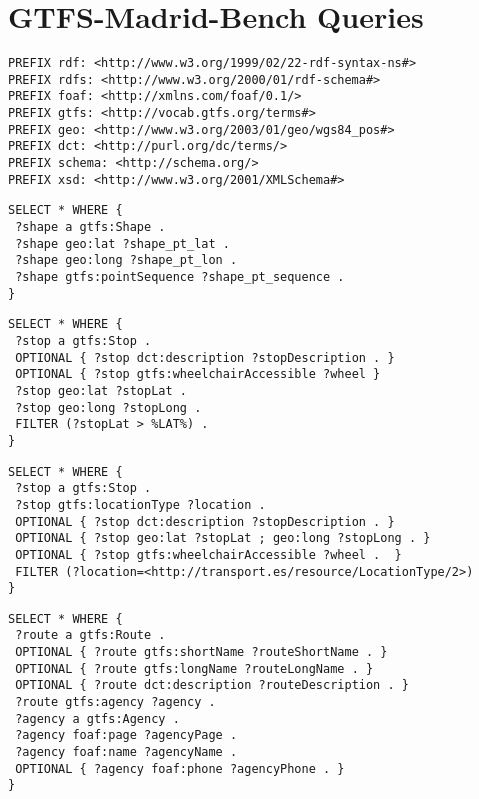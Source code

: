 \chapter{GTFS-Madrid-Bench Queries}
\label{sec:appendix1}

\begin{lstlisting}[caption=Prefixes, label=lst:prefixes, basicstyle=\small,frame=single]
PREFIX rdf: <http://www.w3.org/1999/02/22-rdf-syntax-ns#>
PREFIX rdfs: <http://www.w3.org/2000/01/rdf-schema#>
PREFIX foaf: <http://xmlns.com/foaf/0.1/>
PREFIX gtfs: <http://vocab.gtfs.org/terms#>
PREFIX geo: <http://www.w3.org/2003/01/geo/wgs84_pos#>
PREFIX dct: <http://purl.org/dc/terms/>
PREFIX schema: <http://schema.org/>
PREFIX xsd: <http://www.w3.org/2001/XMLSchema#>
\end{lstlisting}

\begin{lstlisting}[caption=Query 1 - List all shapes with some of their data, label=lst:sparql1, basicstyle=\small,frame=single]
SELECT * WHERE {
 ?shape a gtfs:Shape .
 ?shape geo:lat ?shape_pt_lat .
 ?shape geo:long ?shape_pt_lon .
 ?shape gtfs:pointSequence ?shape_pt_sequence .
}
\end{lstlisting}

\begin{lstlisting}[caption={Query 2 - List all stops with some of their data including geographic coordinates, where the latitude is bigger than its mean}, label=lst:sparql2, basicstyle=\small,frame=single]
SELECT * WHERE {
 ?stop a gtfs:Stop . 
 OPTIONAL { ?stop dct:description ?stopDescription . }
 OPTIONAL { ?stop gtfs:wheelchairAccessible ?wheel }
 ?stop geo:lat ?stopLat . 
 ?stop geo:long ?stopLong .
 FILTER (?stopLat > %LAT%) .		
}
\end{lstlisting}

\begin{lstlisting}[caption={Query 3 - Find the accessibility information for the stations, if available}, label=lst:sparql3, basicstyle=\small,frame=single]
SELECT * WHERE {
 ?stop a gtfs:Stop . 
 ?stop gtfs:locationType ?location .
 OPTIONAL { ?stop dct:description ?stopDescription . }
 OPTIONAL { ?stop geo:lat ?stopLat ; geo:long ?stopLong . }
 OPTIONAL { ?stop gtfs:wheelchairAccessible ?wheel .  }
 FILTER (?location=<http://transport.es/resource/LocationType/2>)
}
\end{lstlisting}

\begin{lstlisting}[caption=Query 4 - List all agencies and their routes with some of their data, label=lst:sparql4, basicstyle=\small,frame=single]
SELECT * WHERE {
 ?route a gtfs:Route .
 OPTIONAL { ?route gtfs:shortName ?routeShortName . }
 OPTIONAL { ?route gtfs:longName ?routeLongName . } 
 OPTIONAL { ?route dct:description ?routeDescription . } 
 ?route gtfs:agency ?agency .
 ?agency a gtfs:Agency .
 ?agency foaf:page ?agencyPage .
 ?agency foaf:name ?agencyName .
 OPTIONAL { ?agency foaf:phone ?agencyPhone . }
}
\end{lstlisting}

